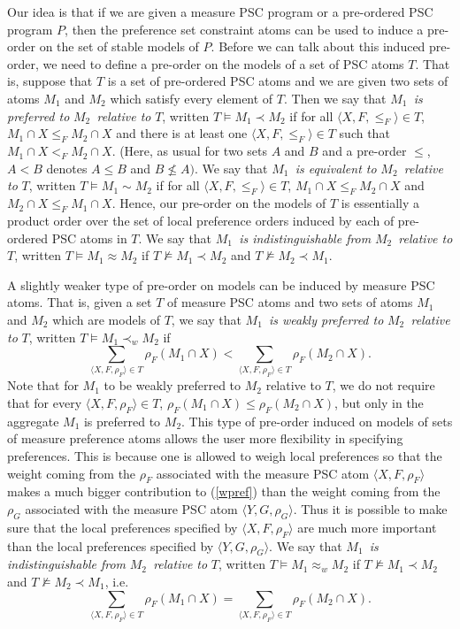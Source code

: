 \documentclass[letterpaper]{article}\usepackage{aaai}
\begin{document}
Our idea is that if we are given a measure PSC program or a pre-ordered PSC
program $P$, then the preference set constraint atoms can be used to induce a
pre-order on the set of stable models of $P$. Before we can talk about this
induced pre-order, we need to define a pre-order on the models of a set of PSC
atoms $T$. That is, suppose that $T$ is a set of pre-ordered PSC atoms and we
are given two sets of atoms $M_{1}$ and $M_{2}$ which satisfy every element of
$T$. Then we say that $M_{1}$\emph{\ is preferred to }$M_{2}$\emph{\ relative
to }$T$, written $T\models M_{1}\prec M_{2}$ if for all $\langle X,F,\leq
_{F}\rangle\in T$, $M_{1}\cap X\leq_{F}M_{2}\cap X$ and there is at least one
$\langle X,F,\leq_{F}\rangle\in T$ such that $M_{1}\cap X<_{F}M_{2}\cap X$.
(Here, as usual for two sets $A$ and $B$ and a pre-order $\leq$, $A<B$ denotes
$A\leq B$ and $B\not \leq A)$. We say that $M_{1}$\emph{\ is equivalent to
}$M_{2}$\emph{\ relative to }$T$, written $T\models M_{1}\sim M_{2}$ if for
all $\langle X,F,\leq_{F}\rangle\in T$, $M_{1}\cap X\leq_{F}M_{2}\cap X$ and
$M_{2}\cap X\leq_{F}M_{1}\cap X$. Hence, our pre-order on the models of $T$ is
essentially a product order over the set of local preference orders induced by
each of pre-ordered PSC atoms in $T$. We say that $M_{1}$\emph{\ is
indistinguishable from }$M_{2}$\emph{\ relative to }$T$, written $T\models
M_{1}\approx M_{2}$ if $T\not \models M_{1}\prec M_{2}$ and $T\not \models
M_{2}\prec M_{1}$.

A slightly weaker type of pre-order on models can be induced by measure PSC
atoms. That is, given a set $T$ of measure PSC atoms and two sets of atoms
$M_{1}$ and $M_{2}$ which are models of $T$, we say that $M_{1}$\emph{\ is
weakly preferred to }$M_{2}$\emph{\ relative to }$T$, written $T\models
M_{1}\prec_{w}M_{2}$ if
\begin{equation}
\sum_{\langle X,F,\rho_{F}\rangle\in T}\rho_{F}(M_{1}\cap X)<\sum_{\langle
X,F,\rho_{F}\rangle\in T}\rho_{F}(M_{2}\cap X). \label{wpref}\end{equation}
Note that for $M_{1}$ to be weakly preferred to $M_{2}$ relative to $T$, we do
not require that for every $\langle X,F,\rho_{F}\rangle\in T$, $\rho_{F}(M_{1}\cap X)\leq\rho_{F}(M_{2}\cap X)$, but only in the aggregate $M_{1}$ is
preferred to $M_{2}$. This type of pre-order induced on models of sets of
measure preference atoms allows the user more flexibility in specifying
preferences. This is because one is allowed to weigh local preferences so that
the weight coming from the $\rho_{F}$ associated with the measure PSC atom
$\langle X,F,\rho_{F}\rangle$ makes a much bigger contribution to
(\ref{wpref}) than the weight coming from the $\rho_{G}$ associated with the
measure PSC atom $\langle Y,G,\rho_{G}\rangle$. Thus it is possible to make
sure that the local preferences specified by $\langle X,F,\rho_{F}\rangle$ are
much more important than the local preferences specified by $\langle
Y,G,\rho_{G}\rangle$. We say that $M_{1}$\emph{\ is indistinguishable from
}$M_{2}$\emph{\ relative to }$T$, written $T\models M_{1}\approx_{w}M_{2}$ if
$T\not \models M_{1}\prec M_{2}$ and $T\not \models M_{2}\prec M_{1}$, i.e.
\[
\sum_{\langle X,F,\rho_{F}\rangle\in T}\rho_{F}(M_{1}\cap X)=\sum_{\langle
X,F,\rho_{F}\rangle\in T}\rho_{F}(M_{2}\cap X).
\]
\end{document}
